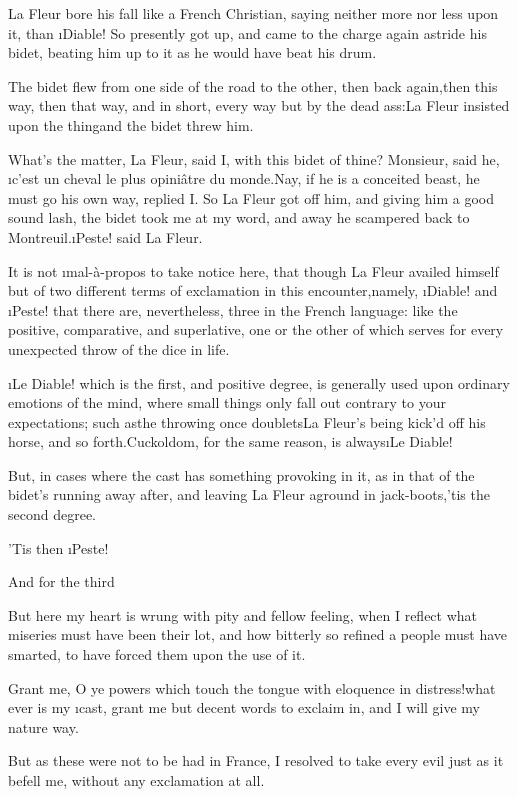 \documentclass[twoside]{article}
\begin{document}
La Fleur bore his fall like a French Christian, saying neither more nor
less upon it, than \i{Diable}!  So presently got up, and came to the charge
again astride his bidet, beating him up to it as he would have beat his
drum.

The bidet flew from one side of the road to the other, then back
again,\tsk then this way, then that way, and in short, every way but by the
dead ass:\tsk La Fleur insisted upon the thing\tsk and the bidet threw him.

What’s the matter, La Fleur, said I, with this bidet of thine?  Monsieur,
said he, \i{c’est un cheval le plus opiniâtre du monde}.\tsk Nay, if he is a
conceited beast, he must go his own way, replied I.  So La Fleur got off
him, and giving him a good sound lash, the bidet took me at my word, and
away he scampered back to Montreuil.\tsk \i{Peste}! said La Fleur.

It is not \i{mal-à-propos} to take notice here, that though La Fleur
availed himself but of two different terms of exclamation in this
encounter,\tsk namely, \i{Diable}! and \i{Peste}! that there are, nevertheless,
three in the French language: like the positive, comparative, and
superlative, one or the other of which serves for every unexpected throw
of the dice in life.

\i{Le Diable}! which is the first, and positive degree, is generally used
upon ordinary emotions of the mind, where small things only fall out
contrary to your expectations; such as\tsk the throwing once doublets\tsk La
Fleur’s being kick’d off his horse, and so forth.\tsk Cuckoldom, for the same
reason, is always\tsk \i{Le Diable}!

But, in cases where the cast has something provoking in it, as in that of
the bidet’s running away after, and leaving La Fleur aground in
jack-boots,\tsk ’tis the second degree.

’Tis then \i{Peste}!

And for the third\tsk 

\tsk But here my heart is wrung with pity and fellow feeling, when I reflect
what miseries must have been their lot, and how bitterly so refined a
people must have smarted, to have forced them upon the use of it.\tsk 

Grant me, O ye powers which touch the tongue with eloquence in
distress!\tsk what ever is my \i{cast}, grant me but decent words to exclaim
in, and I will give my nature way.

\tsk But as these were not to be had in France, I resolved to take every evil
just as it befell me, without any exclamation at all.
\end{document}

